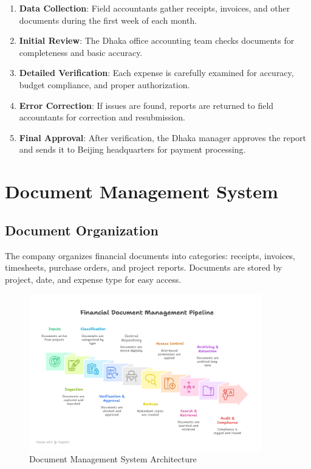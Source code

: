 \begin{enumerate}[leftmargin=*, itemsep=0.25em]
    \item \textbf{Data Collection}: Field accountants gather receipts, invoices, and other documents during the first week of each month.
    \item \textbf{Initial Review}: The Dhaka office accounting team checks documents for completeness and basic accuracy.
    \item \textbf{Detailed Verification}: Each expense is carefully examined for accuracy, budget compliance, and proper authorization.
    \item \textbf{Error Correction}: If issues are found, reports are returned to field accountants for correction and resubmission.
    \item \textbf{Final Approval}: After verification, the Dhaka manager approves the report and sends it to Beijing headquarters for payment processing.
\end{enumerate}

\vspace{0.5em}
\section{Document Management System}

\subsection{Document Organization}
The company organizes financial documents into categories: receipts, invoices, timesheets, purchase orders, and project reports. Documents are stored by project, date, and expense type for easy access.

\begin{figure}[H]
    \centering
    \includegraphics[width=0.9\textwidth]{assets/images/document_management.png}
    \caption{Document Management System Architecture}
    \label{fig:document_management}
\end{figure}

